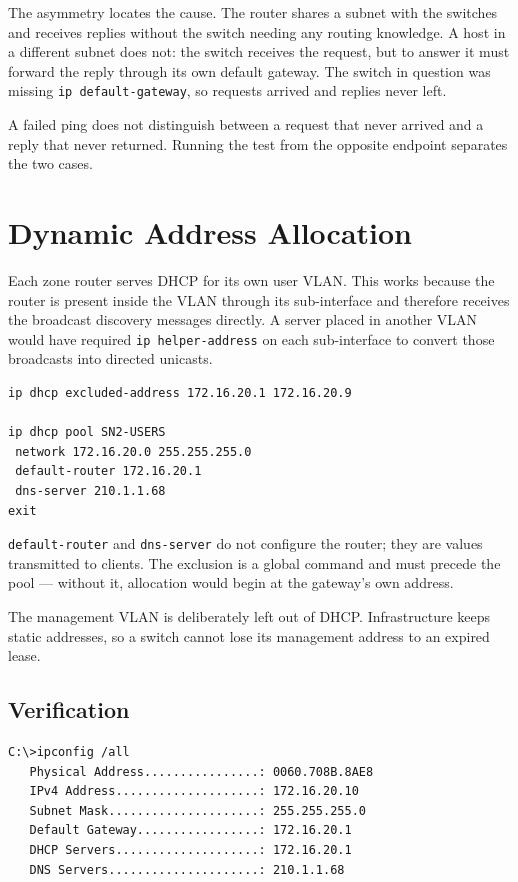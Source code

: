 \documentclass[12pt,a4paper]{article}
\begin{document}
The asymmetry locates the cause. The router shares a subnet with the switches and
receives replies without the switch needing any routing knowledge. A host in a
different subnet does not: the switch receives the request, but to answer it must
forward the reply through its own default gateway. The switch in question was
missing \texttt{ip default-gateway}, so requests arrived and replies never left.

A failed ping does not distinguish between a request that never arrived and a
reply that never returned. Running the test from the opposite endpoint separates
the two cases.

\newpage
\section{Dynamic Address Allocation}

Each zone router serves DHCP for its own user VLAN. This works because the router
is present inside the VLAN through its sub-interface and therefore receives the
broadcast discovery messages directly. A server placed in another VLAN would have
required \texttt{ip helper-address} on each sub-interface to convert those
broadcasts into directed unicasts.

\begin{lstlisting}
ip dhcp excluded-address 172.16.20.1 172.16.20.9

ip dhcp pool SN2-USERS
 network 172.16.20.0 255.255.255.0
 default-router 172.16.20.1
 dns-server 210.1.1.68
exit
\end{lstlisting}

\texttt{default-router} and \texttt{dns-server} do not configure the router; they
are values transmitted to clients. The exclusion is a global command and must
precede the pool --- without it, allocation would begin at the gateway's own
address.

The management VLAN is deliberately left out of DHCP. Infrastructure keeps static
addresses, so a switch cannot lose its management address to an expired lease.

\subsection{Verification}

\begin{lstlisting}
C:\>ipconfig /all
   Physical Address................: 0060.708B.8AE8
   IPv4 Address....................: 172.16.20.10
   Subnet Mask.....................: 255.255.255.0
   Default Gateway.................: 172.16.20.1
   DHCP Servers....................: 172.16.20.1
   DNS Servers.....................: 210.1.1.68
\end{lstlisting}
\end{document}
